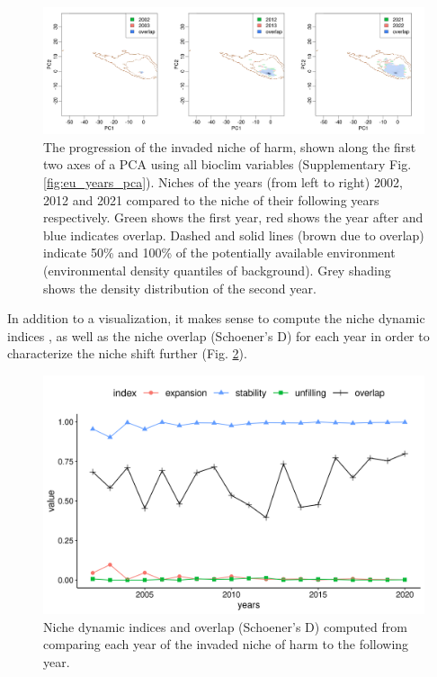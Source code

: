 \documentclass[12pt,a4paper]{article}
\begin{document}
\begin{figure}[!h]
    \centering
    \includegraphics[width = \linewidth]{"../../R/figures/eu-niche-ys.png"}
    \caption{\label{fig:eu_niche_ys} The progression of the invaded niche of \gls{harm}, shown along the first two axes of a PCA using all bioclim variables (Supplementary Fig. \ref{fig:eu_years_pca}). Niches of the years (from left to right) 2002, 2012 and 2021 compared to the niche of their following years respectively. Green shows the first year, red shows the year after and blue indicates overlap. Dashed and solid lines (brown due to overlap) indicate 50\% and 100\% of the potentially available environment (environmental density quantiles of background). Grey shading shows the density distribution of the second year.}

\end{figure}

In addition to a visualization, it makes sense to compute the niche dynamic indices \autocite{guisan2014nichedyn}, as well as the niche overlap (Schoener's D) for each year in order to characterize the niche shift further (Fig. \ref{fig:eu_niche_dyn}).

\begin{figure}[!h]
    \centering
    \includegraphics[width = 0.9\linewidth]{"../../R/figures/eu-niche-dyn.png"}
    \caption{\label{fig:eu_niche_dyn} Niche dynamic indices and overlap (Schoener's D) computed from comparing each year of the invaded niche of \gls{harm} to the following year.}
\end{figure}
\end{document}
